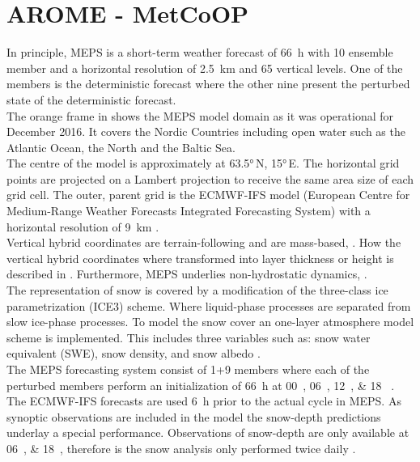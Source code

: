 \section{AROME - MetCoOP}
\label{sec:MEPS}
In principle, MEPS is a short-term weather forecast of \SI{66}{\hour} with 10 ensemble member and a horizontal resolution of \SI{2.5}{\km} and 65 vertical levels. One of the members is the deterministic forecast where the other nine present the perturbed state of the deterministic forecast.
\\
The orange frame in  shows the MEPS model domain as it was operational for December 2016. It covers the Nordic Countries including open water such as the Atlantic Ocean, the North and the Baltic Sea.  
\\
The centre of the model is approximately at \ang{63.5}\,N, \ang{15}\,E. 
The horizontal grid points are projected on a Lambert projection to receive the same area size of each grid cell. 
The outer, parent grid is the ECMWF-IFS model (European Centre for Medium-Range Weather Forecasts Integrated Forecasting System) with a horizontal resolution of \SI{9}{\km} \citep{homleid_verification_2016}. 
\\
Vertical hybrid coordinates are terrain-following and are mass-based, \citep{muller_arome-metcoop:_2017}. How the vertical hybrid coordinates where transformed into layer thickness or height is described in . Furthermore, MEPS underlies non-hydrostatic dynamics, \cite{metcoop_wiki_description_2017}.
\\
The representation of snow is covered by a modification of the three-class ice parametrization (ICE3) scheme. Where liquid-phase processes are separated from slow ice-phase processes. To model the snow cover an one-layer atmosphere model scheme is implemented. This includes three variables such as: snow water equivalent (SWE), snow density, and snow albedo \citep{muller_arome-metcoop:_2017}.
\\
The MEPS forecasting system consist of 1+9 members where each of the perturbed members perform an initialization of \SI{66}{\hour} at \SIlist{00;06;12;18}{\UTC} \citep{metcoop_wiki_description_2017}. The ECMWF-IFS forecasts are used \SI{6}{\hour} prior to the actual cycle in MEPS. As synoptic observations are included in the model the snow-depth predictions underlay a special performance. Observations of snow-depth are only available at \SIlist{06;18}{\UTC}, therefore is the snow analysis only performed twice daily \citep{muller_arome-metcoop:_2017, homleid_verification_2016}. 

